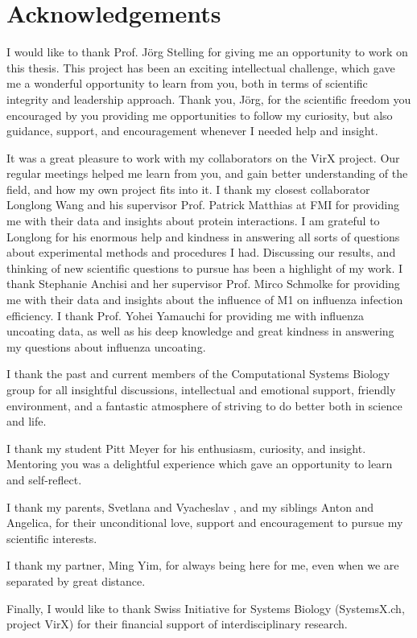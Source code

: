 
\bigskip

\begingroup
\let\clearpage\relax
\let\cleardoublepage\relax
\let\cleardoublepage\relax
\chapter*{Acknowledgements}

\def\thanks#1{%
\begingroup
\leftskip1em
\noindent #1
\par
\endgroup
}

I would like to thank Prof. J\"org Stelling for giving me an opportunity to work on this thesis. This project has been an exciting intellectual challenge, which gave me a wonderful opportunity to learn from you, both in terms of scientific integrity and leadership approach. Thank you, Jörg, for the scientific freedom you encouraged by you providing me opportunities to follow my curiosity, but also guidance, support, and encouragement whenever I needed help and insight.

It was a great pleasure to work with my collaborators on the VirX project. Our regular meetings helped me learn from you, and gain better understanding of the field, and how my own project fits into it. I thank my closest collaborator Longlong Wang  and his supervisor Prof. Patrick Matthias at FMI for providing me with their data and insights about protein interactions. I am grateful to Longlong for his enormous help and kindness in answering all sorts of questions about experimental methods and procedures I had. Discussing our results, and thinking of new scientific questions to pursue has been a highlight of my work. I thank Stephanie Anchisi and her supervisor Prof. Mirco Schmolke for providing me with their data and insights about the influence of M1 on influenza infection efficiency. I thank Prof. Yohei Yamauchi for providing me with influenza uncoating data, as well as his deep knowledge and great kindness in answering my questions about influenza uncoating. 

I thank the past and current members of the Computational Systems Biology group for all insightful discussions, intellectual and emotional support, friendly environment, and a fantastic atmosphere of striving to do better both in science and life.

I thank my student Pitt Meyer for his enthusiasm, curiosity, and insight. Mentoring you was a delightful experience which gave an opportunity to learn and self-reflect.

I thank my parents, Svetlana and Vyacheslav , and my siblings Anton and Angelica, for their unconditional love, support and encouragement to pursue my scientific interests. 

I thank my partner, Ming Yim, for always being here for me, even when we are separated by great distance.

Finally, I would like to thank Swiss Initiative for Systems Biology (SystemsX.ch, project VirX) for their financial support of interdisciplinary research.

\endgroup
